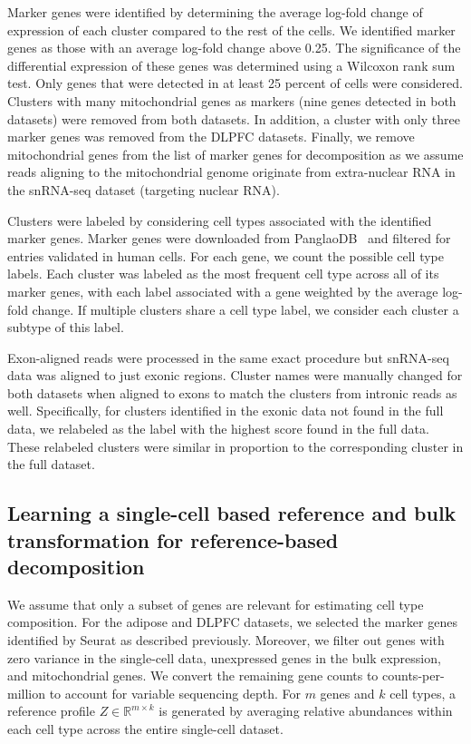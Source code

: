 Marker genes were identified by determining the average log-fold change of expression of each cluster compared to the rest of the cells. We identified marker genes as those with an average log-fold change above 0.25. The significance of the differential expression of these genes was determined using a Wilcoxon rank sum test. Only genes that were detected in at least 25 percent of cells were considered. Clusters with many mitochondrial genes as markers (nine genes detected in both datasets) were removed from both datasets. In addition, a cluster with only three marker genes was removed from the DLPFC datasets. Finally, we remove mitochondrial genes from the list of marker genes for decomposition as we assume reads aligning to the mitochondrial genome originate from extra-nuclear RNA in the snRNA-seq dataset (targeting nuclear RNA). 

Clusters were labeled by considering cell types associated with the identified marker genes. Marker genes were downloaded from PanglaoDB~\cite{Franzen2019-nb} and filtered for entries validated in human cells. For each gene, we count the possible cell type labels. Each cluster was labeled as the most frequent cell type across all of its marker genes, with each label associated with a gene weighted by the average log-fold change. If multiple clusters share a cell type label, we consider each cluster a subtype of this label. 

Exon-aligned reads were processed in the same exact procedure but snRNA-seq data was aligned to just exonic regions. Cluster names were manually changed for both datasets when aligned to exons to match the clusters from intronic reads as well. Specifically, for clusters identified in the exonic data not found in the full data, we relabeled as the label with the highest score found in the full data. These relabeled clusters were similar in proportion to the corresponding cluster in the full dataset.

\subsection{Learning a single-cell based reference and bulk transformation for reference-based decomposition}

We assume that only a subset of genes are relevant for estimating cell type composition. For the adipose and DLPFC datasets, we selected the marker genes identified by Seurat as described previously. Moreover, we filter out genes with zero variance in the single-cell data, unexpressed genes in the bulk expression, and mitochondrial genes. We convert the remaining gene counts to counts-per-million to account for variable sequencing depth. For $m$ genes and $k$ cell types, a reference profile $Z \in \mathbb{R}^{m \times k}$ is generated by averaging relative abundances within each cell type across the entire single-cell dataset.


